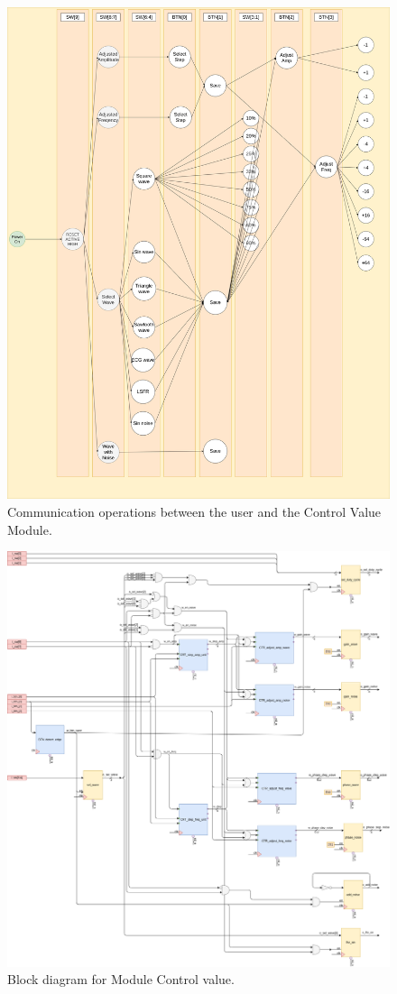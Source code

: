 \begin{figure}[H]
	\centering
	\includegraphics[width=.8\linewidth, height=0.7\textheight]{./../00_spec/spec/UI_task.png}
	\caption{Communication operations between the user and the Control Value Module.}
\end{figure}

\begin{figure}[H]
	\centering
	\includegraphics[width=.8\linewidth]{./../00_spec/spec/UI_rtl.png}
	\caption{Block diagram for Module Control value.}
\end{figure}

